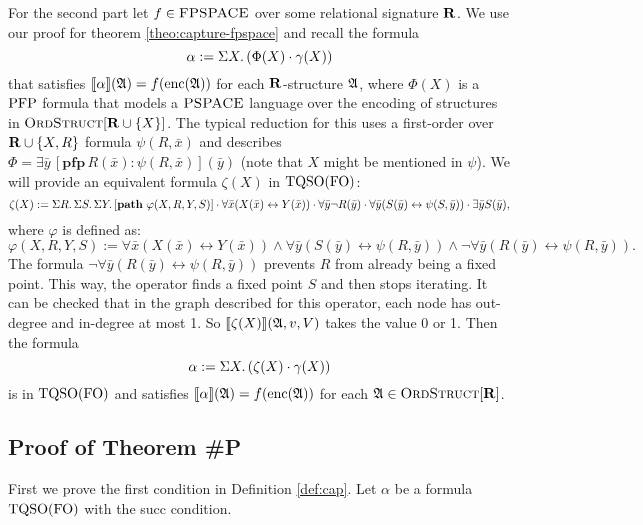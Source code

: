\vspace{1em}
For the second part let $f\in\text{\sc FPSPACE}$ over some relational signature $\mathbf{R}$. We use our proof for theorem \ref{theo:capture-fpspace} and recall the formula
$$
\alpha := \Sigma{X}.\,(\Phi(X)\cdot\gamma(X))
$$
that satisfies ${\llbracket{}{\alpha}\rrbracket}(\mathfrak{A}) = f({\rm enc}(\mathfrak{A}))$ for each $\mathbf{R}$-structure $\mathfrak{A}$, where $\Phi(X)$ is a ${\rm PFP}$ formula that models a $\text{\sc PSPACE}$ language over the encoding of structures in $\text{\sc OrdStruct}[\mathbf{R}\cup\{X\}]$. The typical reduction  for this \cite{G07} uses a first-order over $\mathbf{R}\cup\{X,R\}$ formula $\psi(R,\bar{x})$ and describes $\Phi = \exists\bar{y}\,[\mathbf{pfp}\,R(\bar{x}):\psi(R,\bar{x})](\bar{y})$ (note that $X$ might be mentioned in $\psi$). We will provide an equivalent formula $\zeta(X)$ in ${\rm TQSO}({\rm FO})$:
$$
\zeta(X) := \Sigma{R}.\,\Sigma{S}.\,\Sigma{Y}.\,[{\bf path} \,\,\varphi(X,R,Y,S)]\cdot\forall\bar{x}(X(\bar{x})\leftrightarrow Y(\bar{x}))\cdot\forall\bar{y}\neg R(\bar{y})\cdot\forall\bar{y}(S(\bar{y})\leftrightarrow\psi(S,\bar{y}))\cdot\exists\bar{y}S(\bar{y}),
$$
where $\varphi$ is defined as:
$$
\varphi(X,R,Y,S) := \forall\bar{x}(X(\bar{x})\leftrightarrow Y(\bar{x}))\wedge\forall\bar{y}(S(\bar{y})\leftrightarrow\psi(R,\bar{y}))\wedge\neg\forall\bar{y}(R(\bar{y})\leftrightarrow\psi(R,\bar{y})).
$$
The formula $\neg\forall\bar{y}(R(\bar{y})\leftrightarrow\psi(R,\bar{y}))$ prevents $R$ from already being a fixed point. This way, the operator finds a fixed point $S$ and then stops iterating. It can be checked that in the graph described for this operator, each node has out-degree and in-degree at most 1. So ${\llbracket{}{\zeta(X)}\rrbracket}(\mathfrak{A},v,V)$ takes the value 0 or 1. Then the formula
$$
\alpha := \Sigma{X}.\,(\zeta(X)\cdot\gamma(X))
$$
is in ${\rm TQSO}({\rm FO})$ and satisfies ${\llbracket{}{\alpha}\rrbracket}(\mathfrak{A}) = f({\rm enc}(\mathfrak{A}))$ for each $\mathfrak{A}\in\text{\sc OrdStruct}[\mathbf{R}]$.

\subsection*{Proof of Theorem \#P}

First we prove the first condition in Definition \ref{def:cap}. Let $\alpha$ be a formula ${\rm TQSO}({\rm FO})$ with the succ condition.

